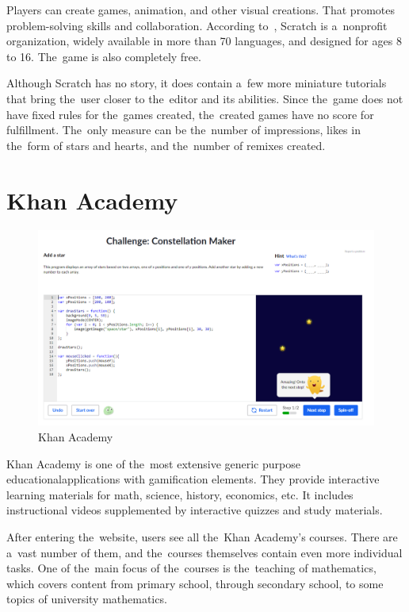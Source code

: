 \pagebreak
Players can create games, animation, and other visual creations.
That promotes problem-solving skills and collaboration.
According to~\cite{a2022_scratch}, Scratch is a~nonprofit organization, widely available in more than 70 languages, and designed for ages 8 to 16.
The~game is also completely free.

Although Scratch has no story, it does contain a~few more miniature tutorials that bring the~user closer to the~editor and its abilities.
Since the~game does not have fixed rules for the~games created, the~created games have no score for fulfillment.
The~only measure can be the~number of impressions, likes in the~form of stars and hearts, and the~number of remixes created. 

\section{Khan Academy}
\label{similar-games:khan-academy}

\begin{figure}
    \centering
    \includegraphics[width=1\linewidth]{assets/similar-games/khanacademy.png}
    \caption{Khan Academy~\cite{a2022_khan}}
    \label{fig:khanacademy}
\end{figure}

Khan Academy is one of the~most extensive generic purpose educational\linebreak{}applications with gamification elements.
They provide interactive learning materials for math, science, history, economics, etc.
It includes instructional videos supplemented by interactive quizzes and study materials.

After entering the~website, users see all the~Khan Academy's courses.
There are a~vast number of them, and the~courses themselves contain even more individual tasks.
One of the~main focus of the~courses is the~teaching of mathematics, which covers content from primary school, through secondary school, to some topics of university mathematics.

